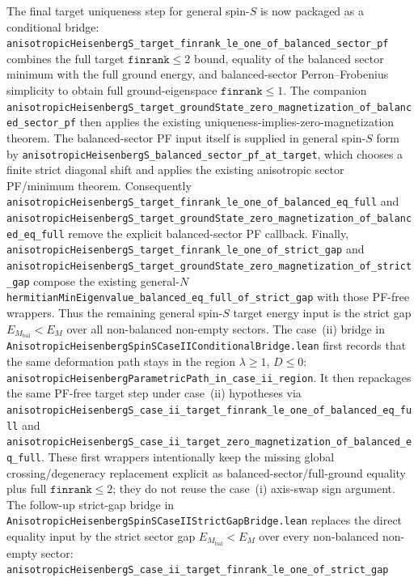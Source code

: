 \documentclass[a4paper,11pt]{article}
\begin{document}
The final target uniqueness step for general spin-\(S\) is now packaged as a
conditional bridge:
\texttt{anisotropicHeisenbergS\_target\_finrank\_le\_one\_of\_balanced\_sector\_pf}
combines the full target \(\texttt{finrank}\le2\) bound, equality of the
balanced sector minimum with the full ground energy, and balanced-sector
Perron--Frobenius simplicity to obtain full ground-eigenspace
\(\texttt{finrank}\le1\).  The companion
\texttt{anisotropicHeisenbergS\_target\_groundState\_zero\_magnetization\_of\_balanced\_sector\_pf}
then applies the existing uniqueness-implies-zero-magnetization theorem.  The
balanced-sector PF input itself is supplied in general spin-\(S\) form by
\texttt{anisotropicHeisenbergS\_balanced\_sector\_pf\_at\_target}, which
chooses a finite strict diagonal shift and applies the existing anisotropic
sector PF/minimum theorem.  Consequently
\texttt{anisotropicHeisenbergS\_target\_finrank\_le\_one\_of\_balanced\_eq\_full}
and
\texttt{anisotropicHeisenbergS\_target\_groundState\_zero\_magnetization\_of\_balanced\_eq\_full}
remove the explicit balanced-sector PF callback.  Finally,
\texttt{anisotropicHeisenbergS\_target\_finrank\_le\_one\_of\_strict\_gap}
and
\texttt{anisotropicHeisenbergS\_target\_groundState\_zero\_magnetization\_of\_strict\_gap}
compose the existing general-\(N\)
\texttt{hermitianMinEigenvalue\_balanced\_eq\_full\_of\_strict\_gap}
with those PF-free wrappers.  Thus the remaining general spin-\(S\) target
energy input is the strict gap
\(E_{M_{\mathrm{bal}}}<E_M\) over all non-balanced non-empty sectors.
The case~(ii) bridge in
\texttt{AnisotropicHeisenbergSpinSCaseIIConditionalBridge.lean} first records
that the same deformation path stays in the region \(\lambda\ge1\),
\(D\le0\):
\texttt{anisotropicHeisenbergParametricPath\_in\_case\_ii\_region}.  It then
repackages the same PF-free target step under case~(ii) hypotheses via
\texttt{anisotropicHeisenbergS\_case\_ii\_target\_finrank\_le\_one\_of\_balanced\_eq\_full}
and
\texttt{anisotropicHeisenbergS\_case\_ii\_target\_zero\_magnetization\_of\_balanced\_eq\_full}.
These first wrappers intentionally keep the missing global
crossing/degeneracy replacement explicit as balanced-sector/full-ground
equality plus full \(\texttt{finrank}\le2\); they do not reuse the case~(i)
axis-swap sign argument.  The follow-up strict-gap bridge in
\texttt{AnisotropicHeisenbergSpinSCaseIIStrictGapBridge.lean} replaces the
direct equality input by the strict sector gap
\(E_{M_{\mathrm{bal}}}<E_M\) over every non-balanced non-empty sector:
\texttt{anisotropicHeisenbergS\_case\_ii\_target\_finrank\_le\_one\_of\_strict\_gap}
\end{document}
